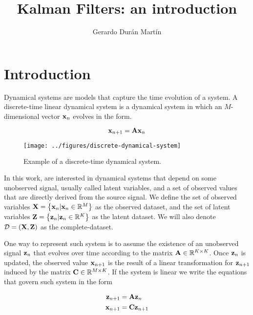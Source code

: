 \documentclass[11pt]{article}
\title{Kalman Filters: an introduction}
\author{Gerardo Durán Martín}
\begin{document}
\maketitle

\section{Introduction}

Dynamical systems are models that capture the time evolution of a system. A discrete-time linear dynamical system is a dynamical system in which an $M$-dimensional vector ${\bf x}_n$ evolves in the form.

\begin{equation}
	{\bf x}_{n+1} = {\bf A x}_n
\end{equation}

\begin{figure}[h!]
	\centering
	\texttt{[image: ../figures/discrete-dynamical-system]}
	\caption{Example of a discrete-time dynamical system.}
	\label{fig:discrete-dynamical-system}
\end{figure}



In this work, are interested in dynamical systems that depend on some unobserved signal, usually called latent variables, and a set of observed values that are directly derived from the source signal. We define the set of observed variables ${\bf X}=\left\{{\bf x}_n \vert {\bf x}_n \in \mathbb{R}^M\right\}$ as the observed dataset, and the set of latent variables ${\bf Z}=\left\{{\bf z}_n \vert {\bf z}_n \in \mathbb{R}^K\right\}$ as the latent dataset. We will also denote $\mathcal{D} = ({\bf X}, {\bf Z})$ as the complete-dataset.

One way to represent such system is to assume the existence of an unobserved signal ${\bf z}_n$ that evolves over time according to the matrix ${\bf A}\in\mathbb{R}^{K\times K}$. Once ${\bf z}_{n}$ is updated, the observed value ${\bf x}_{n+1}$ is the result of a linear transformation for ${\bf z}_{n+1}$ induced by the matrix ${\bf C}\in \mathbb{R}^{M\times K}$. If the system is linear we write the equations that govern such system in the form

\begin{align*}
	{\bf z}_{n+1} &= {\bf A} {\bf z}_{n}\\
	{\bf x}_{n+1} &= {\bf C} {\bf z}_{n+1}
\end{align*}
\end{document}
